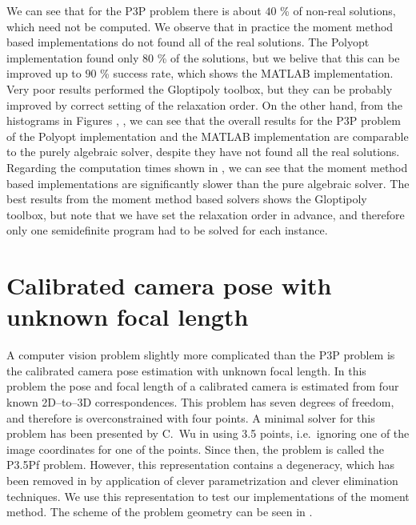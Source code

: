 We can see that for the P3P problem there is about $40$ \% of non-real solutions, which need not be computed.
We observe that in practice the moment method based implementations do not found all of the real solutions.
The Polyopt implementation found only $80$ \% of the solutions, but we belive that this can be improved up to $90$ \% success rate, which shows the MATLAB implementation.
Very poor results performed the Gloptipoly toolbox, but they can be probably improved by correct setting of the relaxation order.
On the other hand, from the histograms in Figures , ,  we can see that the overall results for the P3P problem of the Polyopt implementation and the MATLAB implementation are comparable to the purely algebraic solver, despite they have not found all the real solutions.
Regarding the computation times shown in , we can see that the moment method based implementations are significantly slower than the  pure algebraic solver.
The best results from the moment method based solvers shows the Gloptipoly \cite{gloptipoly} toolbox, but note that we have set the relaxation order in advance, and therefore only one semidefinite program had to be solved for each instance.

\section{Calibrated camera pose with unknown focal length}

A computer vision problem slightly more complicated than the P3P problem is the calibrated camera pose estimation with unknown focal length.
In this problem the pose and focal length of a calibrated camera is estimated from four known 2D--to--3D correspondences.
This problem has seven degrees of freedom, and therefore is overconstrained with four points.
A minimal solver for this problem has been presented by C.~Wu in \cite{P35PfWu} using 3.5 points, i.e.\ ignoring one of the image coordinates for one of the points.
Since then, the problem is called the P3.5Pf problem.
However, this representation contains a degeneracy, which has been removed in \cite{P35Pf} by application of clever parametrization and clever elimination techniques.
We use this representation to test our implementations of the moment method.
The scheme of the problem geometry can be seen in .


